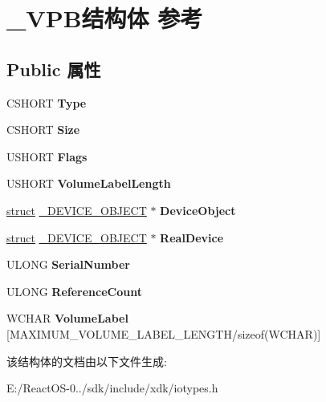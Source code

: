 \hypertarget{struct___v_p_b}{}\section{\+\_\+\+V\+P\+B结构体 参考}
\label{struct___v_p_b}
\subsection*{Public 属性}
\begin{DoxyCompactItemize}
\item 
\mbox{\label{struct___v_p_b_a0d7a63359cdbbdeb9119fdce156a9b0e}} 
C\+S\+H\+O\+RT {\bfseries Type}
\item 
\mbox{\label{struct___v_p_b_a87509d009dca856f8b97b6681f574ec0}} 
C\+S\+H\+O\+RT {\bfseries Size}
\item 
\mbox{\label{struct___v_p_b_adf591e3c6b2ff42b9344021f26bf54a6}} 
U\+S\+H\+O\+RT {\bfseries Flags}
\item 
\mbox{\label{struct___v_p_b_a1a551c42cdfd70c9d542227a932c893e}} 
U\+S\+H\+O\+RT {\bfseries Volume\+Label\+Length}
\item 
\mbox{\label{struct___v_p_b_aaa9f5dad9e48aba6e711ac7f0d9e82f8}} 
\hyperlink{interfacestruct}{struct} \hyperlink{struct___d_e_v_i_c_e___o_b_j_e_c_t}{\+\_\+\+D\+E\+V\+I\+C\+E\+\_\+\+O\+B\+J\+E\+CT} $\ast$ {\bfseries Device\+Object}
\item 
\mbox{\label{struct___v_p_b_af08bb9e8f49511570677c186915f9a27}} 
\hyperlink{interfacestruct}{struct} \hyperlink{struct___d_e_v_i_c_e___o_b_j_e_c_t}{\+\_\+\+D\+E\+V\+I\+C\+E\+\_\+\+O\+B\+J\+E\+CT} $\ast$ {\bfseries Real\+Device}
\item 
\mbox{\label{struct___v_p_b_aecc752a2a31e9544254b0efb5fd691ec}} 
U\+L\+O\+NG {\bfseries Serial\+Number}
\item 
\mbox{\label{struct___v_p_b_ae50b4ec9aa2442de756fd826b3d33844}} 
U\+L\+O\+NG {\bfseries Reference\+Count}
\item 
\mbox{\label{struct___v_p_b_a070a6fb9600cabf828f6db42488f2a3b}} 
W\+C\+H\+AR {\bfseries Volume\+Label} \mbox{[}M\+A\+X\+I\+M\+U\+M\+\_\+\+V\+O\+L\+U\+M\+E\+\_\+\+L\+A\+B\+E\+L\+\_\+\+L\+E\+N\+G\+TH/sizeof(W\+C\+H\+AR)\mbox{]}
\end{DoxyCompactItemize}


该结构体的文档由以下文件生成\+:\begin{DoxyCompactItemize}
\item 
E\+:/\+React\+O\+S-\/0../sdk/include/xdk/iotypes.\+h\end{DoxyCompactItemize}
